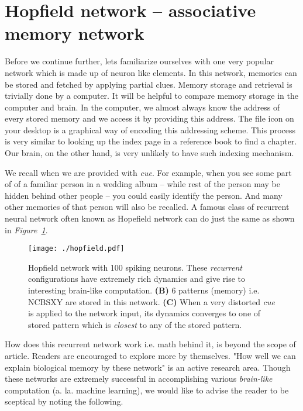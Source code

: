 \documentclass[]{resonance}
\newcommand\Fig[1]{\textit{Figure~\ref{#1}}}
\begin{document}
\section{Hopfield network -- associative memory network}\label{sec:hopfield}

Before we continue further, lets familiarize ourselves with one very popular
network which is made up of neuron like elements. In this network, memories can
be stored and fetched by applying partial clues. Memory storage and retrieval is
trivially done by a computer. It will be helpful to compare memory storage in
the computer and brain. In the computer, we almost always know the address of
every stored memory and we access it by providing this address. The file icon on
your desktop is a graphical way of encoding this addressing scheme. This process
is very similar to looking up the index page in a reference book to find a
chapter. Our brain, on the other hand, is very unlikely to have such indexing
mechanism. 

We recall when we are provided with \textit{cue}. For example, when you see some
part of of a familiar person in a wedding album -- while rest of the person may
be hidden behind other people -- you could easily identify the person. And many
other memories of that person will also be recalled. A famous class of recurrent
neural network often known as Hopefield network can do just the same as shown in
\Fig{fig:hopfield}.

\begin{figure}[!hb]
    \centering
    \caption{Hopfield network with 100 spiking neurons. These \emph{recurrent} configurations have 
        extremely rich dynamics and give rise to interesting brain-like
        computation. \textbf{(B)} 6 patterns (memory) i.e. NCBSXY are stored in this
        network. \textbf{(C)} When a very distorted \textit{cue} is applied to
        the network input, its dynamics converges to one of stored pattern which
        is \emph{closest} to any of the stored pattern.
    }\label{fig:hopfield}
    \texttt{[image: ./hopfield.pdf]}
\end{figure}

How does this recurrent network work i.e. math behind it, is beyond the scope of
article. Readers are encouraged to explore more by themselves. "How well we can
explain biological memory by these network" is an active research area.  Though
these networks are extremely successful in accomplishing various
\textit{brain-like} computation (a. la. machine learning), we would like to
advise the reader to be sceptical by noting the following.
\end{document}
